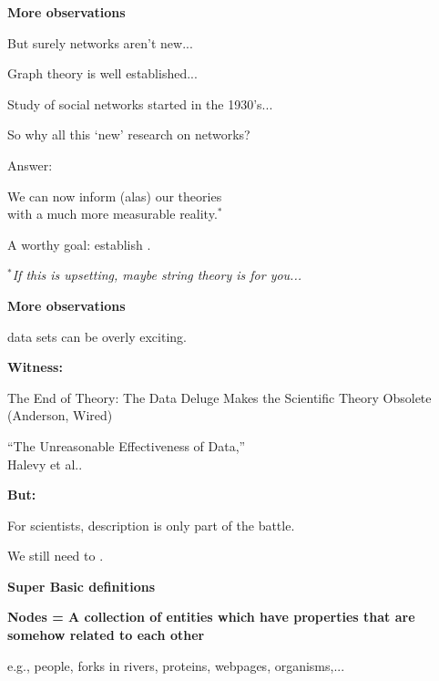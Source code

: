 
  \textbf{More observations}

  
  
    But surely \alert{networks aren't new}...
  
    Graph theory is well established...
  
    Study of social networks started in the 1930's...
  
    So why all this `new' research on networks?
  
    \alert{Answer:} 
  
    We can now inform (alas) our theories \\
    with a much more measurable reality.$^\ast$
   
    A worthy goal: establish .

    \medskip
    {
    {\small 
      $\mbox{}^\ast$\textit{If this is upsetting, maybe string theory is for you...}}
  }
  

  \textbf{More observations}

  
  
     data sets can be overly \alert{exciting}.
  
  
  \textbf{Witness:}
    
    
      The End of Theory: The Data Deluge Makes the Scientific Theory Obsolete (Anderson, Wired)
    
      ``The Unreasonable Effectiveness of Data,''\\ Halevy et al.\cite{halevy2009a}.
    
  

  \textbf{But:}
  
   
    For scientists, description is only part of the battle.
   
    We still need to .
  
  




  \textbf{Super Basic definitions}

  \textbf{\alert{Nodes} = A collection of entities 
      which have properties that
      are somehow related to each other}
    
      
      e.g., people, forks in rivers, proteins, webpages, organisms,...
    
